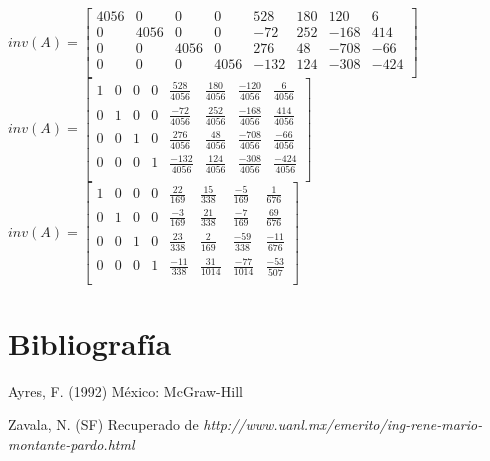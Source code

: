 \documentclass[12pt,a4paper,final]{article}
\begin{document}
\newline \newline
$
inv(A)=
\left[\begin{matrix}
4056 & 0 & 0 & 0 & 528 & 180 & 120 & 6 \\
0 & 4056 & 0 & 0 & -72 & 252 & -168 & 414\\
0 & 0 & 4056 & 0 & 276 & 48 & -708 & -66 \\
0 & 0 & 0 & 4056 & -132 & 124 & -308 & -424\\
\end{matrix}\right]
$
\newline \newline
\newline \newline
$
inv(A)=
\left[\begin{matrix}
1 & 0 & 0 & 0 &\frac{528}{4056} & \frac{180}{4056} & \frac{-120}{4056} & \frac{6}{4056} \\
0 & 1 & 0 & 0 &\frac{-72}{4056} & \frac{252}{4056} & \frac{-168}{4056} & \frac{414}{4056}\\
0 & 0 & 1 & 0 &\frac{276}{4056} & \frac{48}{4056} & \frac{-708}{4056} & \frac{-66}{4056} \\
0 & 0 & 0 & 1 &\frac{-132}{4056} & \frac{124}{4056} & \frac{-308}{4056} & \frac{-424}{4056}\\
\end{matrix}\right]
$
\newline\newline
\newline \newline
$
inv(A)=
\left[\begin{matrix}
1 & 0 & 0 & 0 &\frac{22}{169} & \frac{15}{338} & \frac{-5}{169} & \frac{1}{676} \\
0 & 1 & 0 & 0 &\frac{-3}{169} & \frac{21}{338} & \frac{-7}{169} & \frac{69}{676}\\
0 & 0 & 1 & 0 &\frac{23}{338} & \frac{2}{169} & \frac{-59}{338} & \frac{-11}{676} \\
0 & 0 & 0 & 1 &\frac{-11}{338} & \frac{31}{1014} & \frac{-77}{1014} & \frac{-53}{507}\\
\end{matrix}\right]
$
\section{Bibliografía}

\begin{thebibliography}{9}
Ayres, F. (1992)
 México: McGraw-Hill

Zavala, N. (SF)
 Recuperado de {\it http://www.uanl.mx/emerito/ing-rene-mario-montante-pardo.html}
\end{thebibliography}
\end{document}
